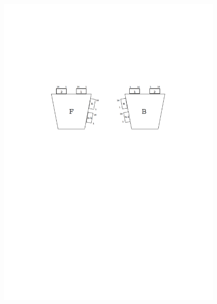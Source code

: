 \begin{figure}[tbp]
		\begin{minipage}{0.49\hsize}
		\centering
        \includegraphics[width=\textwidth,page=2]{img/pdf/TGC.pdf}
        \end{minipage}
        \begin{minipage}{0.49\hsize}
        \centering

\end{minipage}
\end{figure}
